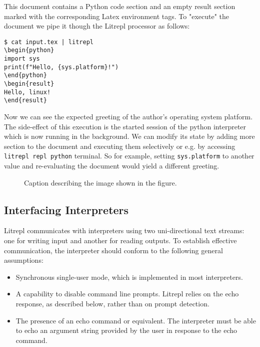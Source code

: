 \documentclass[a4paper,12pt,twocolumn]{article}
\begin{document}
This document contains a Python code section and an empty result section marked
with the corresponding Latex environment tags. To "execute" the document we
pipe it though the Litrepl processor as follows:

\begin{comment}
\begin{sh}
echo '\begin{verbatim}'
echo '$ cat input.tex | litrepl'
echo "sys.platform='linux'" | litrepl repl python >/dev/null
cat input.tex | litrepl
echo '\end{verbatim}'
\end{sh}
\end{comment}
\begin{verbatim}
$ cat input.tex | litrepl
\begin{python}
import sys
print(f"Hello, {sys.platform}!")
\end{python}
\begin{result}
Hello, linux!
\end{result}
\end{verbatim}

Now we can see the expected greeting of the author's operating system platform.
The side-effect of this execution is the started session of the python
interpreter which is now running in the background. We can modify its state by
adding more section to the document and executing them selectively or e.g. by
accessing \verb|litrepl repl python| terminal. So for example, setting
\verb|sys.platform| to another value and re-evaluating the document would yield
a different greeting.

\begin{figure*}[t]
  \centering
  
  \caption{Caption describing the image shown in the figure.}
  \label{fig:resource-allocation}
\end{figure*}


\subsection{Interfacing Interpreters}

Litrepl communicates with interpreters using two uni-directional text streams:
one for writing input and another for reading outputs. To establish effective
communication, the interpreter should conform to the following general
assumptions:

\begin{itemize}
  \item Synchronous single-user mode, which is implemented in most interpreters.
  \item A capability to disable command line prompts. Litrepl relies on the echo
        response, as described below, rather than on prompt detection.
  \item The presence of an echo command or equivalent. The interpreter must be
        able to echo an argument string provided by the user in response to the
        echo command.
\end{itemize}
\end{document}

